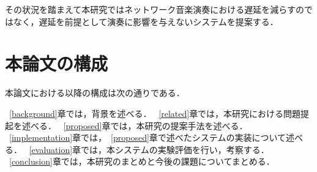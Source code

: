 その状況を踏まえて本研究ではネットワーク音楽演奏における遅延を減らすのではなく，遅延を前提として演奏に影響を与えないシステムを提案する．

\section{本論文の構成}

本論文における以降の構成は次の通りである．

~\ref{background}章では，背景を述べる．
~\ref{related}章では，本研究における問題提起を述べる．
~\ref{proposed}章では，本研究の提案手法を述べる．
~\ref{implementation}章では，~\ref{proposed}章で述べたシステムの実装について述べる．
~\ref{evaluation}章では，本システムの実験評価を行い，考察する．
~\ref{conclusion}章では，本研究のまとめと今後の課題についてまとめる．


